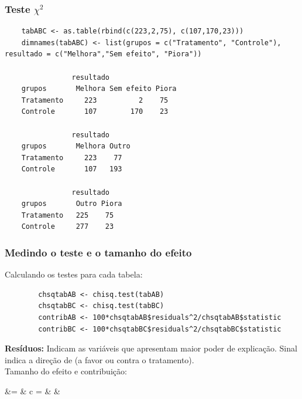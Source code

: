 \documentclass[graphics,14pt]{beamer}
\begin{document}
\begin{frame}[t,fragile=singleslide]
\frametitle{Teste $\chi^2$}

	\begin{lstlisting}
	tabABC <- as.table(rbind(c(223,2,75), c(107,170,23)))
	dimnames(tabABC) <- list(grupos = c("Tratamento", "Controle"), resultado = c("Melhora","Sem efeito", "Piora"))
	
	            resultado
	grupos       Melhora Sem efeito Piora
	Tratamento     223          2    75
	Controle       107        170    23
	
	            resultado
	grupos       Melhora Outro
	Tratamento     223    77
	Controle       107   193
	
	            resultado
	grupos       Outro Piora
	Tratamento   225    75
	Controle     277    23
	\end{lstlisting}
\end{frame}
\begin{frame}[t,fragile=singleslide]
\frametitle{Medindo o teste e o tamanho do efeito}
	Calculando os testes para cada tabela:
	\vspace{0.5cm}
	\begin{lstlisting}
		chsqtabAB <- chisq.test(tabAB)
		chsqtabBC <- chisq.test(tabBC)
		contribAB <- 100*chsqtabAB$residuals^2/chsqtabAB$statistic
		contribBC <- 100*chsqtabBC$residuals^2/chsqtabBC$statistic
	\end{lstlisting}
	\vspace{0.5cm}
	\textbf{Resíduos:} Indicam as variáveis que apresentam maior poder de explicação. Sinal indica a direção de (a favor ou contra o tratamento).\\
	\vspace{0.5cm}
	Tamanho do efeito e contribuição:
	\begin{flalign*}
	&\Psi =  &  c =  & & \\ 
	\end{flalign*}
\end{frame}
\end{document}
